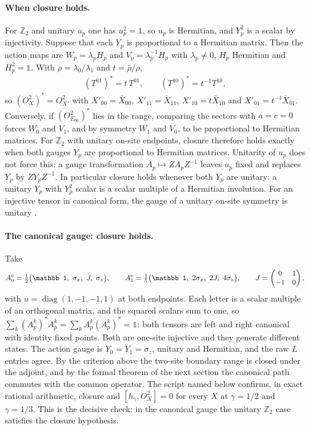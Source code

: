\documentclass{article}
\begin{document}
\paragraph{When closure holds.} For $\mathbb Z_2$ and unitary $u_p$ one has
$u_p^2=\mathbb 1$, so $u_p$ is Hermitian, and $Y_p^2$ is a scalar by
injectivity. Suppose that each $Y_p$ is proportional to a Hermitian
matrix. Then the action maps are $W_p=\lambda_pH_p$ and
$V_p=\lambda_p^{-1}H_p$ with $\lambda_p\neq0$, $H_p$ Hermitian and
$H_p^2=\mathbb 1$. With
$\rho=\lambda_0/\lambda_1$ and $t=\bar\rho/\rho$,
\begin{align}
    (T^{01})^*=t\,T^{01},\qquad (T^{10})^*=t^{-1}T^{10},
    \label{eq:glm23_parent_commutation_crossed_adjoint}
\end{align}
so $(O^2_X)^*=O^2_{X'}$ with $X'_{00}=\bar X_{00}$, $X'_{11}=\bar X_{11}$,
$X'_{10}=t\bar X_{10}$ and $X'_{01}=t^{-1}\bar X_{01}$. Conversely, if
$(O^2_{E_{00}})^*$ lies in the range, comparing the sectors with $a=c=0$
forces $W_0$ and $V_1$, and by symmetry $W_1$ and $V_0$, to be
proportional to Hermitian matrices. For $\mathbb Z_2$ with unitary
on-site endpoints, closure therefore holds exactly when both gauges $Y_p$
are proportional to Hermitian matrices. Unitarity of $u_p$ does not force
this: a gauge transformation $A_p\mapsto ZA_pZ^{-1}$ leaves $u_p$ fixed
and replaces $Y_p$ by $ZY_pZ^{-1}$. In particular closure holds whenever
both $Y_p$ are unitary: a unitary $Y_p$ with $Y_p^2$ scalar is a scalar
multiple of a Hermitian involution. For an injective tensor in canonical
form, the gauge of a unitary on-site symmetry is unitary
\cite[Lemma~1 and Theorem~2]{PerezGarcia2008StringOrder}.

\paragraph{The canonical gauge: closure holds.} Take
\begin{align}
    A_0^{\rm c}=\tfrac12\bigl(\mathbb 1,\ \sigma_x,\ J,\ \sigma_z\bigr),\qquad
    A_1^{\rm c}=\tfrac15\bigl(\mathbb 1,\ 2\sigma_x,\ 2J,\ 4\sigma_z\bigr),
    \qquad J=\begin{pmatrix}0&1\\-1&0\end{pmatrix},
    \label{eq:glm23_parent_commutation_canonical_tensors}
\end{align}
with $u=\operatorname{diag}(1,-1,-1,1)$ at both endpoints. Each letter is
a scalar multiple of an orthogonal matrix, and the squared scalars sum to
one, so $\sum_k(A_p^k)^*A_p^k=\sum_kA_p^k(A_p^k)^*=\mathbb 1$: both tensors
are left and right canonical with identity fixed points. Both are
one-site injective and they generate different states. The action gauge
is $Y_0=Y_1=\sigma_z$, unitary and Hermitian, and the raw $L$ entries
agree. By the criterion above the two-site boundary range is closed under
the adjoint, and by the formal theorem of the next section the canonical
path commutes with the common operator. The script named below confirms,
in exact rational arithmetic, closure and $[h_\gamma,O^2_X]=0$ for every
$X$ at $\gamma=1/2$ and $\gamma=1/3$. This is the decisive check: in the
canonical gauge the unitary $\mathbb Z_2$ case satisfies the closure
hypothesis.
\end{document}
